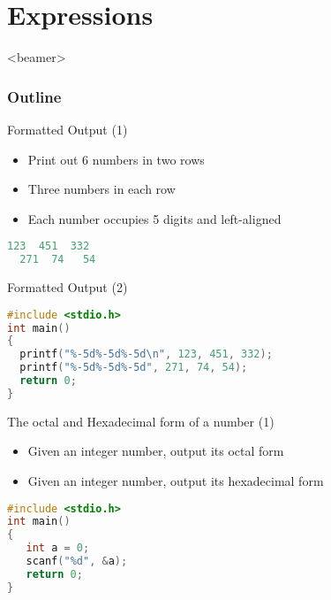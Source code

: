 \section{Expressions}
\label{sec:exp}
\begin{frame}<beamer>
    \frametitle{Outline}
    \tableofcontents[currentsection]
\end{frame}

\begin{frame}[fragile]{Formatted Output (1)}
\begin{itemize}
	\item {Print out 6 numbers in two rows}
	\item {Three numbers in each row}
	\item {Each number occupies 5 digits and left-aligned}
\end{itemize}

\begin{lstlisting}[numbers=none, language=c, rulecolor=\color{blue}]
  123  451  332
  271  74   54
\end{lstlisting}
\end{frame}

\ifx\answer\undefined
\begin{frame}[fragile]{Formatted Output (2)}

\begin{lstlisting}[numbers=none, language=c, rulecolor=\color{blue}]
#include <stdio.h>
int main()
{
  printf("%-5d%-5d%-5d\n", 123, 451, 332);
  printf("%-5d%-5d%-5d", 271, 74, 54);
  return 0;
}
\end{lstlisting}

\end{frame}
\fi


\begin{frame}[fragile]{The octal and Hexadecimal form of a number (1)}
\begin{itemize}
	\item {Given an integer number, output its octal form}
	\item {Given an integer number, output its hexadecimal form}
\end{itemize}

\begin{lstlisting}[numbers=none, language=c, rulecolor=\color{blue}]
#include <stdio.h>
int main()
{
   int a = 0;
   scanf("%d", &a);
   return 0;
}
\end{lstlisting}
\end{frame}

